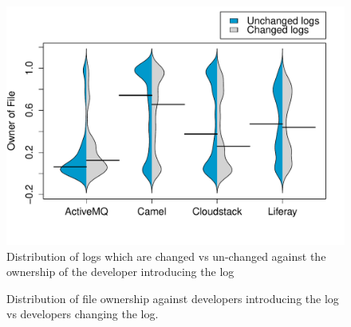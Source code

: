 \begin{figure}[tb]
	\centering
	\includegraphics[width=1\linewidth]{ChangedvsUnchangedlogs}
	\caption{Distribution of logs which are changed vs un-changed against the ownership of the developer introducing the log}
	\label{fig:ChangedvsUnchangedlogs}
\end{figure}
\begin{figure}[tb]
	
	\centering
	\caption{Distribution of file ownership against developers introducing the log vs developers changing the log.}
	\label{fig:ChangedvsChangesorNot}
\end{figure}



